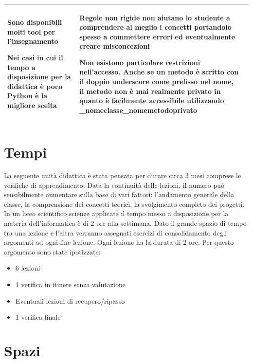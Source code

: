 \documentclass[12pt,a4paper]{article}
\begin{document}
\begin{table}[H]
\begin{tabularx}{\linewidth}{|>{\RaggedRight}p{16mm}|*{2}{I |}}
        \item Sono disponibili molti tool per l’insegnamento 
        \item Nei casi in cui il tempo a disposizione per la didattica è poco Python è la migliore scelta 
        &   \item Regole non rigide non aiutano lo studente a comprendere al meglio i concetti portandolo spesso a commettere errori ed eventualmente creare misconcezioni
            \item Non esistono particolare restrizioni nell’accesso. Anche se un metodo è scritto con il doppio underscore come prefisso nel nome, il metodo non è mai realmente privato in quanto è facilmente accessibile utilizzando \_nomeclasse\_nomemetodoprivato
            \\
    \hline
\end{tabularx}
\end{table}




\section{Tempi}\label{tempi}
La seguente unità didattica è stata pensata per durare circa 3 mesi comprese le verifiche di apprendimento. Data la continuità delle lezioni, il numero può sensibilmente aumentare sulla base di vari fattori: l’andamento generale della classe, la comprensione dei concetti teorici, la svolgimento completo dei progetti. In un liceo scientifico scienze applicate il tempo messo a disposizione per la materia dell’informatica è di 2 ore alla settimana. Dato il grande spazio di tempo tra una lezione e l’altra verranno assegnati esercizi di consolidamento degli argomenti ad ogni fine lezione.
Ogni lezione ha la durata di 2 ore. Per questo argomento sono state ipotizzate:
\begin{itemize}
     \item 6 lezioni
     \item 1 verifica in itinere senza valutazione
     \item Eventuali lezioni di recupero/ripasso
     \item 1  verifica finale
   \end{itemize}



\section{Spazi}\label{spazi}
\end{document}
